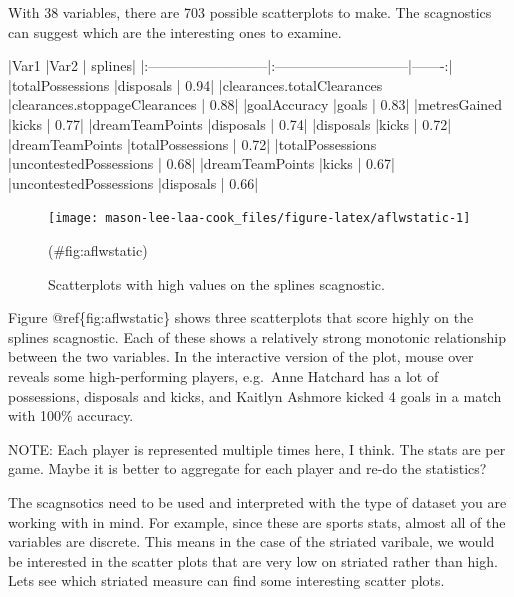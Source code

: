With 38 variables, there are 703 possible scatterplots to make. The
scagnostics can suggest which are the interesting ones to examine.

\begin{Schunk}


|Var1                       |Var2                          | splines|
|:--------------------------|:-----------------------------|-------:|
|totalPossessions           |disposals                     |    0.94|
|clearances.totalClearances |clearances.stoppageClearances |    0.88|
|goalAccuracy               |goals                         |    0.83|
|metresGained               |kicks                         |    0.77|
|dreamTeamPoints            |disposals                     |    0.74|
|disposals                  |kicks                         |    0.72|
|dreamTeamPoints            |totalPossessions              |    0.72|
|totalPossessions           |uncontestedPossessions        |    0.68|
|dreamTeamPoints            |kicks                         |    0.67|
|uncontestedPossessions     |disposals                     |    0.66|

\end{Schunk}

\begin{Schunk}
\begin{figure}
\texttt{[image: mason-lee-laa-cook\_files/figure-latex/aflwstatic-1]} \caption[Scatterplots with high values on the splines scagnostic]{Scatterplots with high values on the splines scagnostic.}(\#fig:aflwstatic)
\end{figure}
\end{Schunk}

Figure @ref\{fig:aflwstatic\} shows three scatterplots that score highly
on the splines scagnostic. Each of these shows a relatively strong
monotonic relationship between the two variables. In the interactive
version of the plot, mouse over reveals some high-performing players,
e.g.~Anne Hatchard has a lot of possessions, disposals and kicks, and
Kaitlyn Ashmore kicked 4 goals in a match with 100\% accuracy.

NOTE: Each player is represented multiple times here, I think. The stats
are per game. Maybe it is better to aggregate for each player and re-do
the statistics?

The scagnsotics need to be used and interpreted with the type of dataset
you are working with in mind. For example, since these are sports stats,
almost all of the variables are discrete. This means in the case of the
striated varibale, we would be interested in the scatter plots that are
very low on striated rather than high. Lets see which striated measure
can find some interesting scatter plots.

